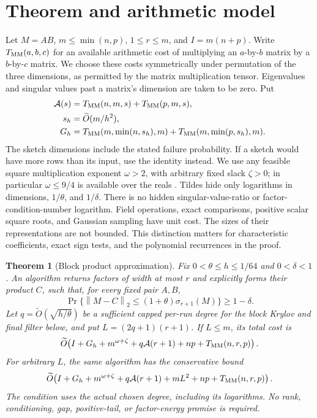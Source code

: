 \documentclass[11pt]{article}
\newtheorem{theorem}{Theorem}
\newcommand{\norm}[1]{\left\lVert#1\right\rVert}
\newcommand{\tO}{\widetilde O}
\newcommand{\MM}{T_{\rm MM}}
\newcommand{\Ac}{\mathcal A}
\begin{document}
\section{Theorem and arithmetic model}
Let \(M=AB\), \(m\leq\min(n,p)\), \(1\leq r\leq m\), and
\(I=m(n+p)\). Write \(\MM(a,b,c)\) for an available arithmetic cost
of multiplying an \(a\)-by-\(b\) matrix by a \(b\)-by-\(c\) matrix.
We choose these costs symmetrically under permutation of the three
dimensions, as permitted by the matrix multiplication tensor.
Eigenvalues and singular values past a matrix's dimension are taken to be zero.
Put
\begin{align*}
 \Ac(s)&=\MM(n,m,s)+\MM(p,m,s),\\
 s_h&=\tO(m/h^2),\\
 G_h&=\MM(m,\min(n,s_h),m)+\MM(m,\min(p,s_h),m).
\end{align*}
The sketch dimensions include the stated failure probability. If a sketch
would have more rows than its input, use the identity instead.
We use any feasible square multiplication exponent \(\omega>2\), with
arbitrary fixed slack \(\zeta>0\); in particular \(\omega\leq9/4\)
is available over the reals \cite{amanov}.
Tildes hide only logarithms in dimensions, \(1/\theta\), and \(1/\delta\).
There is no hidden singular-value-ratio or factor-condition-number logarithm.
Field operations, exact comparisons, positive scalar square roots, and
Gaussian sampling have unit cost. The sizes of their representations are
not bounded. This distinction matters for characteristic coefficients,
exact sign tests, and the polynomial recurrences in the proof.

\begin{theorem}[Block product approximation]\label{thm:main}
Fix \(0<\theta\leq h\leq1/64\) and \(0<\delta<1\).
An algorithm returns factors of width at most \(r\) and explicitly forms
their product \(C\), such that, for every fixed pair \(A,B\),
\[
 \Pr\{\norm{M-C}_2\leq(1+\theta)\sigma_{r+1}(M)\}\geq1-\delta.
\]
Let \(q=\tO(\sqrt{h/\theta})\) be a sufficient capped per-run degree
for the block Krylov and final filter below, and put
\(L=(2q+1)(r+1)\). If \(L\leq m\), its total cost is
\begin{equation}\label{eq:main}
 \tO\!\left(I+G_h+m^{\omega+\zeta}+q\Ac(r+1)
                          +np+\MM(n,r,p)\right).
\end{equation}
For arbitrary \(L\), the same algorithm has the conservative bound
\begin{equation}\label{eq:general}
 \tO\!\left(I+G_h+m^{\omega+\zeta}+q\Ac(r+1)+mL^2
                          +np+\MM(n,r,p)\right).
\end{equation}
The condition uses the actual chosen degree, including its logarithms.
No rank, conditioning, gap, positive-tail, or factor-energy promise is required.
\end{theorem}
\end{document}

